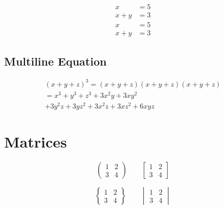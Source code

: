 \documentclass[a4paper,12pt]{article}
\begin{document}
	\begin{align}
		x &= 5 \\
		x + y &= 3 \\
		x &= 5 \\
		x + y &= 3
	\end{align}
	
	\subsection{Multiline Equation}
	
	\begin{multline}
		(x+y+z)^3 = (x+y+z)(x+y+z)(x+y+z) \\
		= x^3+y^3+z^3+3x^2y+3xy^2 \\
		+3y^2z+3yz^2+3x^2z+3xz^2+6xyz
	\end{multline}
	
	\section{Matrices}
	
	\[
	\begin{pmatrix}
		1 & 2 \\
		3 & 4
	\end{pmatrix}
	\qquad
	\begin{bmatrix}
		1 & 2 \\
		3 & 4
	\end{bmatrix}
	\]
	
	\[
	\begin{Bmatrix}
		1 & 2 \\
		3 & 4
	\end{Bmatrix}
	\qquad
	\begin{vmatrix}
		1 & 2 \\
		3 & 4
	\end{vmatrix}
	\]
	
\end{document}
